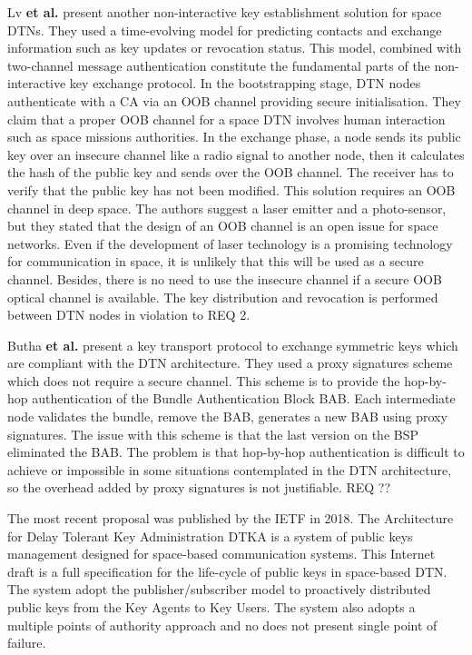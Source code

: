 Lv \textbf{et al.} \cite{lv2014non} present another non-interactive key establishment solution for space DTNs. They used a time-evolving model for predicting contacts and exchange information such as key updates or revocation status. This model, combined with two-channel message authentication constitute the fundamental parts of the non-interactive key exchange protocol. In the bootstrapping stage, DTN nodes authenticate with a CA via an OOB channel providing secure initialisation. They claim that a proper OOB channel for a space DTN involves human interaction such as space missions authorities. In the exchange phase, a node sends its public key over an insecure channel like a radio signal to another node, then it calculates the hash of the public key and sends over the OOB channel. The receiver has to verify that the public key has not been modified. This solution requires an OOB channel in deep space. The authors suggest a laser emitter and a photo-sensor, but they stated that the design of an OOB channel is an open issue for space networks. Even if the development of laser technology is a promising technology for communication in space, it is unlikely that this will be used as a secure channel. Besides, there is no need to use the insecure channel if a secure OOB optical channel is available.  The key distribution and revocation is performed between DTN nodes in violation to REQ 2.  

Butha \textbf{et al.} \cite{bhutta2014efficient} present a key transport protocol to exchange symmetric keys which are compliant with the DTN architecture. They used a proxy signatures scheme which does not require a secure channel. This scheme is to provide the hop-by-hop authentication of the Bundle Authentication Block BAB. Each intermediate node validates the bundle, remove the BAB,  generates a new BAB using proxy signatures. The issue with this scheme is that the last version on the BSP eliminated the BAB.  The problem is that hop-by-hop authentication is difficult to achieve or impossible in some situations contemplated in the DTN architecture, so the overhead added by proxy signatures is not justifiable. REQ ??



The most recent proposal was published by the IETF \cite{burleigh-dtnwg-dtka-01} in 2018. The Architecture for Delay Tolerant Key Administration DTKA is a system of public keys management designed for space-based communication systems. This Internet draft is a full specification for the life-cycle of public keys in space-based DTN. The system adopt the publisher/subscriber model to proactively distributed public keys from the Key Agents to Key Users. The system also adopts a  multiple points of authority approach and no does not present single point of failure. 

